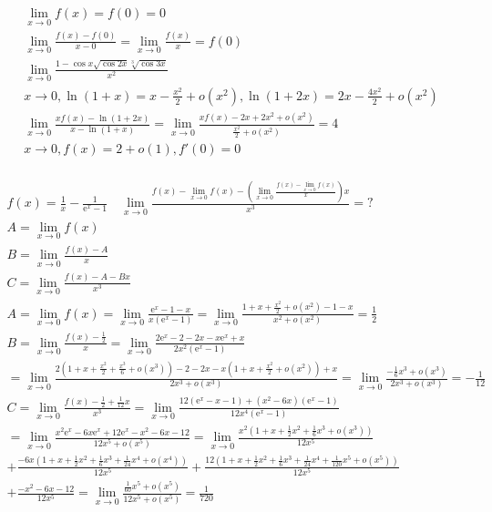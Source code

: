 \documentclass{article}
\begin{document}
\begin{align*}
    \lim_{x \to 0} f(x) = f(0) = 0 \\
    \lim_{x \to 0} \frac{f(x)-f(0)}{x-0} = \lim_{x \to 0} \frac{f(x)}{x} = f(0) \\
    \lim_{x \to 0} \frac{1-\cos x \sqrt{\cos 2x}\sqrt[3]{\cos 3x}}{x^2} \\
    x \to 0 , \ln(1+x) = x - \frac{x^2}{2} + o(x^2) , \ln(1+2x) = 2x - \frac{4x^2}{2} + o(x^2) \\
    \lim_{x \to 0} \frac{xf(x)-\ln(1+2x)}{x-\ln(1+x)} = \lim_{x \to 0} \frac{xf(x)-2x+2x^2+o(x^2)}{\frac{x^2}{2}+o(x^2)} = 4 \\
    x \to 0 ,f(x) = 2 + o(1) , f'(0) = 0 \\ 
\end{align*}

\clearpage
\begin{align*}
    f(x) = \frac{1}{x} - \frac{1}{\mathrm{e}^{x}-1} \quad \lim_{x \to 0} \frac{f(x)-\lim_{x \to 0}f(x) - \left( \lim_{x \to 0}\frac{f(x)-\lim_{x \to 0}f(x)}{x} \right)x}{x^3} = ? \\ 
    A = \lim_{x \to 0}f(x) \\ 
    B = \lim_{x \to 0}\frac{f(x)-A}{x} \\ 
    C = \lim_{x \to 0} \frac{f(x)-A-Bx}{x^3} \\ 
    A = \lim_{x \to 0}f(x) = \lim_{x \to 0} \frac{\mathrm{e}^{x}-1-x}{x(\mathrm{e}^{x}-1)} = \lim_{x \to 0} \frac{1+x+\frac{x^2}{2}+o(x^2)-1-x}{x^2 +o(x^2)} = \frac{1}{2} \\
    B = \lim_{x \to 0} \frac{ f(x) - \frac{1}{2}}{x} = \lim_{x \to 0} \frac{2\mathrm{e}^{x}-2-2x-x\mathrm{e}^{x}+x}{2x^2 (\mathrm{e}^{x}-1)} \\ 
    = \lim_{x \to 0} \frac{2(1+x+\frac{x^2}{2}+\frac{x^3}{6}+o(x^3))-2-2x-x(1+x+\frac{x^2}{2}+o(x^2))+x}{2x^3+o(x^3)} = \lim_{x \to 0} \frac{-\frac{1}{6}x^3+o(x^3)}{2x^3+o(x^3)} = -\frac{1}{12} \\
    C = \lim_{x \to 0} \frac{f(x)-\frac{1}{2}+\frac{1}{12}x}{x^3} = \lim_{x \to 0} \frac{12(\mathrm{e}^{x}-x-1)+(x^2-6x)(\mathrm{e}^{x}-1)}{12x^4(\mathrm{e}^{x}-1)} \\
    = \lim_{x \to 0} \frac{x^2\mathrm{e}^{x}-6x\mathrm{e}^{x}+12\mathrm{e}^{x}-x^2-6x-12}{12x^5+o(x^5)} = \lim_{x \to 0} \frac{x^2(1+x+\frac{1}{2}x^2+\frac{1}{6}x^3+o(x^3))}{12x^5} \\
    + \frac{-6x(1+x+\frac{1}{2}x^2+\frac{1}{6}x^3+\frac{1}{24}x^4+o(x^4))}{12x^5} + \frac{12(1+x+\frac{1}{2}x^2+\frac{1}{6}x^3+\frac{1}{24}x^4+\frac{1}{120}x^5+o(x^5))}{12x^5} \\
    + \frac{-x^2-6x-12}{12x^5} = \lim_{x\to 0} \frac{\frac{1}{60}x^5+o(x^5)}{12x^5+o(x^5)} = \frac{1}{720}\\
\end{align*}
\end{document}
